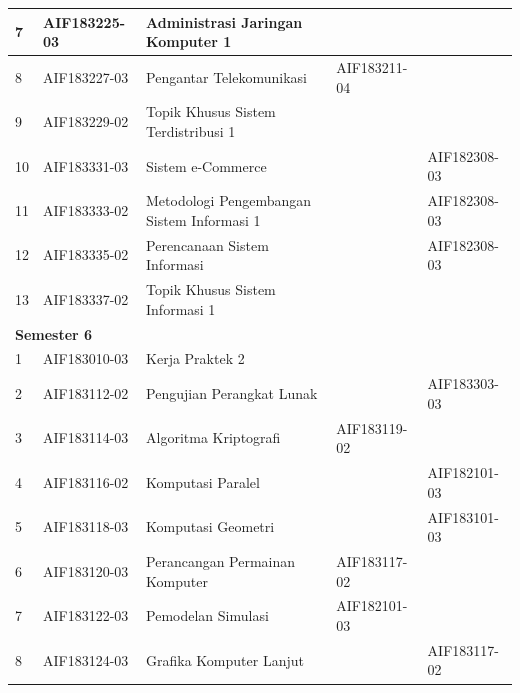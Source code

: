 \documentclass[a4paper,twoside]{article}
\begin{document}
\begin{enumerate}
\begin{enumerate}
\begin{table}[H]
\begin{tabular}{|p{0.5cm}|p{2.85cm}|p{4.95cm}|p{2.7cm}|p{2.7cm}|}
7 & AIF183225-03 & Administrasi Jaringan Komputer 1 &  &  \\ \hline
8 & AIF183227-03 & Pengantar Telekomunikasi & AIF183211-04 &  \\ \hline
9 & AIF183229-02 & Topik Khusus Sistem Terdistribusi 1 &  &  \\ \hline
10 & AIF183331-03 & Sistem e-Commerce &  & AIF182308-03 \\ \hline
11 & AIF183333-02 & Metodologi Pengembangan Sistem Informasi 1 &  & AIF182308-03 \\ \hline
12 & AIF183335-02 & Perencanaan Sistem Informasi &  & AIF182308-03 \\ \hline
13 & AIF183337-02 & Topik Khusus Sistem Informasi 1 &  &  \\ \hline
\multicolumn{5}{|l|}{\textbf{Semester 6}} \\ \hline
1 & AIF183010-03 & Kerja Praktek 2 &  &  \\ \hline
2 & AIF183112-02 & Pengujian Perangkat Lunak &  & AIF183303-03 \\ \hline
3 & AIF183114-03 & Algoritma Kriptografi & AIF183119-02 &  \\ \hline
4 & AIF183116-02 & Komputasi Paralel &  & AIF182101-03 \\ \hline
5 & AIF183118-03 & Komputasi Geometri &  & AIF183101-03 \\ \hline
6 & AIF183120-03 & Perancangan Permainan Komputer & AIF183117-02 &  \\ \hline
7 & AIF183122-03 & Pemodelan Simulasi & AIF182101-03 &  \\ \hline
8 & AIF183124-03 & Grafika Komputer Lanjut &  & AIF183117-02 \\ \hline
					\end{tabular}
	\label{tab:DaftarMataKuliahPilihanDanPrasyaratnya}
\end{table}


\end{enumerate}
\end{enumerate}
\end{document}
